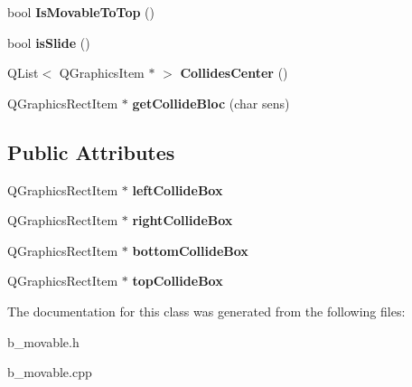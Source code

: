 \begin{DoxyCompactItemize}
\item 
\hypertarget{class_b___movable_a68bb6a98d031f9495cdeb80b9aa325c4}{}bool {\bfseries Is\+Movable\+To\+Top} ()\label{class_b___movable_a68bb6a98d031f9495cdeb80b9aa325c4}

\item 
\hypertarget{class_b___movable_a44d1413ec8bceda3b1a50c673b429d03}{}bool {\bfseries is\+Slide} ()\label{class_b___movable_a44d1413ec8bceda3b1a50c673b429d03}

\item 
\hypertarget{class_b___movable_a081e4e71fb9483330f3315e6b32bbcbb}{}Q\+List$<$ Q\+Graphics\+Item $\ast$ $>$ {\bfseries Collides\+Center} ()\label{class_b___movable_a081e4e71fb9483330f3315e6b32bbcbb}

\item 
\hypertarget{class_b___movable_a20e7bebfd31b39218c151e573b3dd756}{}Q\+Graphics\+Rect\+Item $\ast$ {\bfseries get\+Collide\+Bloc} (char sens)\label{class_b___movable_a20e7bebfd31b39218c151e573b3dd756}

\end{DoxyCompactItemize}
\subsection*{Public Attributes}
\begin{DoxyCompactItemize}
\item 
\hypertarget{class_b___movable_ab838f983e5e7b13148fc7f4873f2c347}{}Q\+Graphics\+Rect\+Item $\ast$ {\bfseries left\+Collide\+Box}\label{class_b___movable_ab838f983e5e7b13148fc7f4873f2c347}

\item 
\hypertarget{class_b___movable_a5da8e8b462e4504f219857a3e007ad97}{}Q\+Graphics\+Rect\+Item $\ast$ {\bfseries right\+Collide\+Box}\label{class_b___movable_a5da8e8b462e4504f219857a3e007ad97}

\item 
\hypertarget{class_b___movable_a6ad546481827dc987708ad36023ba21b}{}Q\+Graphics\+Rect\+Item $\ast$ {\bfseries bottom\+Collide\+Box}\label{class_b___movable_a6ad546481827dc987708ad36023ba21b}

\item 
\hypertarget{class_b___movable_a0609a13a4c686a8c7a4a0edb5e87efbf}{}Q\+Graphics\+Rect\+Item $\ast$ {\bfseries top\+Collide\+Box}\label{class_b___movable_a0609a13a4c686a8c7a4a0edb5e87efbf}

\end{DoxyCompactItemize}


The documentation for this class was generated from the following files\+:\begin{DoxyCompactItemize}
\item 
b\+\_\+movable.\+h\item 
b\+\_\+movable.\+cpp\end{DoxyCompactItemize}
